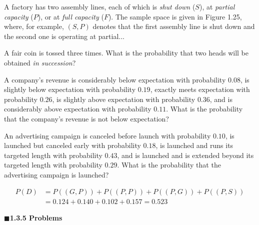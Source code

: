 \documentclass[10pt, twocolumn]{article}
\begin{document}
\begin{description}[font=\bfseries, labelindent=0pt, leftmargin=3.5em]
    \item[1.2.11] A factory has two assembly lines, each of which is \textit{shut down} ($S$), at \textit{partial capacity} ($P$), or at \textit{full capacity} ($F$). The sample space is given in Figure 1.25, where, for example, $(S, P)$ denotes that the first assembly line is shut down and the second one is operating at partial...
    
    \item[1.2.12] A fair coin is tossed three times. What is the probability that two heads will be obtained \textit{in succession}?
    
    \item[1.2.13] A company's revenue is considerably below expectation with probability $0.08$, is slightly below expectation with probability $0.19$, exactly meets expectation with probability $0.26$, is slightly above expectation with probability $0.36$, and is considerably above expectation with probability $0.11$. What is the probability that the company's revenue is not below expectation?
    
    \item[1.2.14] An advertising campaign is canceled before launch with probability $0.10$, is launched but canceled early with probability $0.18$, is launched and runs its targeted length with probability $0.43$, and is launched and is extended beyond its targeted length with probability $0.29$. What is the probability that the advertising campaign is launched?
\end{description}

\vspace{1em}


\begin{align*}
P(D) &= P((G, P)) + P((P, P)) + P((P, G)) + P((P, S)) \\
     &= 0.124 + 0.140 + 0.102 + 0.157 = 0.523
\end{align*}

\vspace{0.5em}
\noindent\textcolor{myblue}{$\blacksquare$}\;\textbf{\large 1.3.5 \quad Problems}
\vspace{-0.5em}
\hrulefill
\vspace{0.8em}
\end{document}
